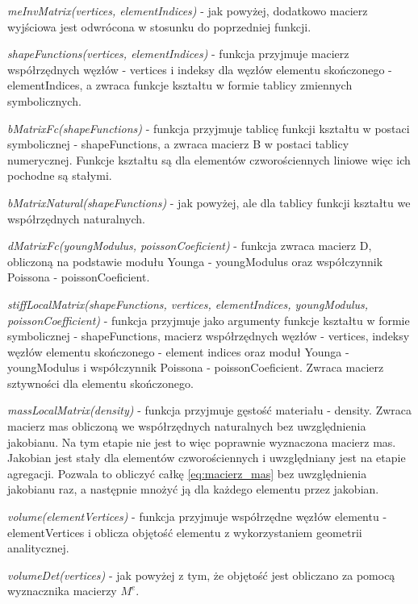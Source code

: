 \vspace {3mm}
\textit{meInvMatrix(vertices, elementIndices)} - jak powyżej, dodatkowo macierz wyjściowa jest odwrócona w stosunku do poprzedniej funkcji.

\vspace {3mm}
\textit{shapeFunctions(vertices, elementIndices)} - funkcja przyjmuje macierz współrzędnych węzłów - vertices i indeksy dla węzłów elementu skończonego - elementIndices, a zwraca funkcje kształtu w formie tablicy zmiennych symbolicznych.

\vspace {3mm}
\textit{bMatrixFc(shapeFunctions)} - funkcja przyjmuje tablicę funkcji kształtu w postaci symbolicznej - shapeFunctions, a zwraca macierz B w postaci tablicy numerycznej. Funkcje kształtu są dla elementów czworościennych liniowe więc ich pochodne są stałymi. 

\vspace {3mm}
\textit{bMatrixNatural(shapeFunctions)} - jak powyżej, ale dla tablicy funkcji kształtu we współrzędnych naturalnych.

\vspace {3mm}
\textit{dMatrixFc(youngModulus, poissonCoeficient)} - funkcja zwraca macierz D, obliczoną na podstawie modułu Younga - youngModulus oraz współczynnik Poissona - poissonCoeficient.

\vspace {3mm}
\textit{stiffLocalMatrix(shapeFunctions, vertices, elementIndices, youngModulus, poissonCoefficient)} - funkcja przyjmuje jako argumenty funkcje kształtu w formie symbolicznej - shapeFunctions, macierz współrzędnych węzłów - vertices, indeksy węzłów elementu skończonego - element indices oraz moduł Younga - youngModulus i współczynnik Poissona - poissonCoeficient. Zwraca macierz sztywności dla elementu skończonego.

\vspace {3mm}
\textit{massLocalMatrix(density)} - funkcja przyjmuje gęstość materiału - density. Zwraca macierz mas obliczoną we współrzędnych naturalnych bez uwzględnienia jakobianu. Na tym etapie nie jest to więc poprawnie wyznaczona macierz mas. Jakobian jest stały dla elementów czworościennych i uwzględniany jest na etapie agregacji. Pozwala to obliczyć całkę \ref{eq:macierz_mas} bez uwzględnienia jakobianu raz, a następnie mnożyć ją dla każdego elementu przez jakobian.

\vspace {3mm}
\textit{volume(elementVertices)} - funkcja przyjmuje współrzędne węzłów elementu - elementVertices i oblicza objętość elementu z wykorzystaniem geometrii analitycznej.

\vspace {3mm}
\textit{volumeDet(vertices)} - jak powyżej z tym, że objętość jest obliczano za pomocą wyznacznika macierzy \( M^e \).


